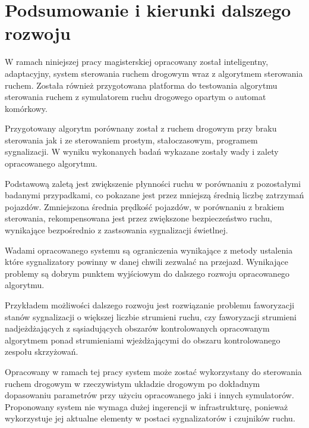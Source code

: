 \chapter{Podsumowanie i kierunki dalszego rozwoju}
W ramach niniejszej pracy magisterskiej opracowany został inteligentny, adaptacyjny, system sterowania ruchem drogowym wraz z algorytmem sterowania ruchem. Została również przygotowana platforma do testowania algorytmu sterowania ruchem z symulatorem ruchu drogowego opartym o automat komórkowy.

Przygotowany algorytm porównany został z ruchem drogowym przy braku sterowania jak i ze sterowaniem prostym, stałoczasowym, programem sygnalizacji. W wyniku wykonanych badań wykazane zostały wady i zalety opracowanego algorytmu.

Podstawową zaletą jest zwiększenie płynności ruchu w porównaniu z pozostałymi badanymi przypadkami, co pokazane jest przez mniejszą średnią liczbę zatrzymań pojazdów. Zmniejszona średnia prędkość pojazdów, w porównaniu z brakiem sterowania, rekompensowana jest przez zwiększone bezpieczeństwo ruchu, wynikające bezpośrednio z zastsowania sygnalizacji świetlnej.

Wadami opracowanego systemu są ograniczenia wynikające z metody ustalenia które sygnalizatory powinny w danej chwili zezwalać na przejazd. Wynikające problemy są dobrym punktem wyjściowym do dalszego rozwoju opracowanego algorytmu.

Przykładem możliwości dalszego rozwoju jest rozwiązanie problemu faworyzacji stanów sygnalizacji o większej liczbie strumieni ruchu, czy faworyzacji strumieni nadjeżdżających z sąsiadujących obszarów kontrolowanych opracowanym algorytmem ponad strumieniami wjeżdżającymi do obszaru kontrolowanego zespołu skrzyżowań.

Opracowany w ramach tej pracy system może zostać wykorzystany do sterowania ruchem drogowym w rzeczywistym układzie drogowym po dokładnym dopasowaniu parametrów przy użyciu opracowanego jaki i innych symulatorów. Proponowany system nie wymaga dużej ingerencji w infrastrukturę, ponieważ wykorzystuje jej aktualne elementy w postaci sygnalizatorów i czujników ruchu.
